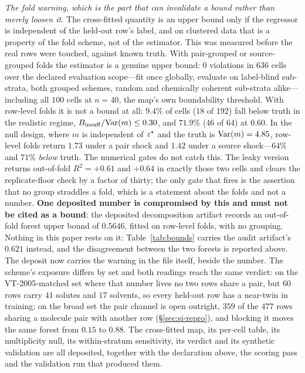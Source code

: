 \emph{The fold warning, which is the part that can invalidate a bound rather than merely loosen it.}
The cross-fitted quantity is an upper bound only if the regressor is independent of the held-out
row's label, and on clustered data that is a property of the fold scheme, not of the estimator. This
was measured before the real rows were touched, against known truth. With pair-grouped or
source-grouped folds the estimator is a genuine upper bound: $0$ violations in $636$ cells over the
declared evaluation scope---fit once globally, evaluate on label-blind sub-strata, both grouped
schemes, random and chemically coherent sub-strata alike---including all $100$ cells at $n{=}40$,
the map's own boundability threshold. With row-level folds it is not a bound at all: $9.4\%$ of
cells ($18$ of $192$) fall below truth in the realistic regime, $B_{\mathrm{insuff}}/\mathrm{Var}(m)\le0.30$, and
$71.9\%$ ($46$ of $64$) at $0.60$. In the null design, where $m$ is independent of $z^\star$ and the
truth is $\mathrm{Var}(m)=4.85$, row-level folds return $1.73$ under a pair shock and $1.42$ under a source
shock---$64\%$ and $71\%$ \emph{below} truth. The numerical gates do not catch this. The leaky
version returns out-of-fold $R^2=+0.61$ and $+0.64$ in exactly those two cells and clears the
replicate-floor check by a factor of thirty; the only gate that fires is the assertion that no
group straddles a fold, which is a statement about the folds and not a number. \textbf{One deposited
number is compromised by this and must not be cited as a bound}: the deposited
decomposition artifact records an out-of-fold forest upper bound of $0.5646$, fitted on row-level folds, with no
grouping. Nothing in this paper rests on it: Table~\ref{tab:bounds} carries the audit artifact's
$0.621$ instead, and the disagreement between the two forests is reported above. The deposit now
carries the warning in the file itself, beside the number. The scheme's exposure differs by set and
both readings reach the same verdict: on the VT-2005-matched set where that number lives no two
rows share a pair, but $60$ rows carry $41$ solutes and $17$ solvents, so every held-out row has a
near-twin in training; on the broad set the pair channel is open outright, $359$ of the $477$ rows
sharing a molecule pair with another row (\S\ref{sec:si-repro}), and blocking it moves the same
forest from $0.15$ to $0.88$. The cross-fitted map, its per-cell table, its multiplicity null, its
within-stratum sensitivity, its verdict and its synthetic validation are all deposited, together with
the declaration above, the scoring pass and the validation run that produced them.
